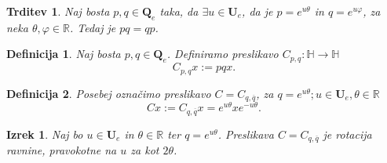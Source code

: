 \documentclass{beamer}
\def\R{\mathbb{R}} %
\def\H{\mathbb{H}} %
\def\Qe{\textbf{Q}_{e}} %
\def\Ue{\textbf{U}_{e}} %
\newcommand{\conj}[1]{\overline{#1}}
\newtheorem{izrek}{Izrek}
\newtheorem{trditev}{Trditev}
\newtheorem{definicija}{Definicija}
\begin{document}
\begin{frame}
   \begin{trditev}
      Naj bosta $p, q \in \Qe$ taka, da $\exists u\in \Ue$, da je $p = e^{u\theta}$ in $q = e^{u\varphi}$,
      za neka $\theta, \varphi \in \R$.
      Tedaj je $pq = qp$.
   \end{trditev}
\end{frame}


\begin{frame}
   \begin{definicija}
      Naj bosta $p, q \in \Qe$. Definiramo preslikavo $C_{p,q} : \H \to \H$
      \[
      C_{p,q} x := pqx.   
      \]
   \end{definicija}

   \pause
   \begin{definicija}
      Posebej označimo preslikavo $C = C_{q, \conj{q}}$, za $q = e^{u\theta}; u \in \Ue, \theta \in \R$
      \[
      Cx := C_{q, \conj{q}}x = e^{u\theta}xe^{-u\theta}.   
      \]
   \end{definicija}
\end{frame}


\begin{frame}
   \begin{izrek}
      Naj bo $u \in \Ue$ in $\theta \in \R$ ter $q = e^{u\theta}$. Preslikava $C = C_{q, \conj{q}}$ je 
      rotacija ravnine, pravokotne na $u$ za kot $2\theta$.
   \end{izrek}
\end{frame}

\end{document}
